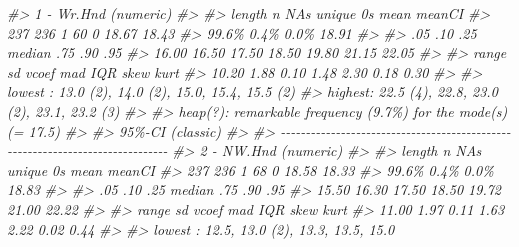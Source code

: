 \documentclass[
]{book}
\newenvironment{Shaded}{\begin{snugshade}}{\end{snugshade}}
\newcommand{\CommentTok}[1]{\textcolor[rgb]{0.56,0.35,0.01}{\textit{#1}}}
\begin{document}
\begin{Shaded}
\begin{Highlighting}[]
\CommentTok{\#\textgreater{} 1 {-} Wr.Hnd (numeric)}
\CommentTok{\#\textgreater{} }
\CommentTok{\#\textgreater{}   length      n    NAs  unique     0s   mean  meanCI\textquotesingle{}}
\CommentTok{\#\textgreater{}      237    236      1      60      0  18.67   18.43}
\CommentTok{\#\textgreater{}           99.6\%   0.4\%           0.0\%          18.91}
\CommentTok{\#\textgreater{}                                                     }
\CommentTok{\#\textgreater{}      .05    .10    .25  median    .75    .90     .95}
\CommentTok{\#\textgreater{}    16.00  16.50  17.50   18.50  19.80  21.15   22.05}
\CommentTok{\#\textgreater{}                                                     }
\CommentTok{\#\textgreater{}    range     sd  vcoef     mad    IQR   skew    kurt}
\CommentTok{\#\textgreater{}    10.20   1.88   0.10    1.48   2.30   0.18    0.30}
\CommentTok{\#\textgreater{}                                                     }
\CommentTok{\#\textgreater{} lowest : 13.0 (2), 14.0 (2), 15.0, 15.4, 15.5 (2)}
\CommentTok{\#\textgreater{} highest: 22.5 (4), 22.8, 23.0 (2), 23.1, 23.2 (3)}
\CommentTok{\#\textgreater{} }
\CommentTok{\#\textgreater{} heap(?): remarkable frequency (9.7\%) for the mode(s) (= 17.5)}
\CommentTok{\#\textgreater{} }
\CommentTok{\#\textgreater{} \textquotesingle{} 95\%{-}CI (classic)}
\CommentTok{\#\textgreater{} }
\CommentTok{\#\textgreater{} {-}{-}{-}{-}{-}{-}{-}{-}{-}{-}{-}{-}{-}{-}{-}{-}{-}{-}{-}{-}{-}{-}{-}{-}{-}{-}{-}{-}{-}{-}{-}{-}{-}{-}{-}{-}{-}{-}{-}{-}{-}{-}{-}{-}{-}{-}{-}{-}{-}{-}{-}{-}{-}{-}{-}{-}{-}{-}{-}{-}{-}{-}{-}{-}{-}{-}{-}{-}{-}{-}{-}{-}{-}{-}{-}{-}{-}{-} }
\CommentTok{\#\textgreater{} 2 {-} NW.Hnd (numeric)}
\CommentTok{\#\textgreater{} }
\CommentTok{\#\textgreater{}   length      n    NAs  unique     0s   mean  meanCI\textquotesingle{}}
\CommentTok{\#\textgreater{}      237    236      1      68      0  18.58   18.33}
\CommentTok{\#\textgreater{}           99.6\%   0.4\%           0.0\%          18.83}
\CommentTok{\#\textgreater{}                                                     }
\CommentTok{\#\textgreater{}      .05    .10    .25  median    .75    .90     .95}
\CommentTok{\#\textgreater{}    15.50  16.30  17.50   18.50  19.72  21.00   22.22}
\CommentTok{\#\textgreater{}                                                     }
\CommentTok{\#\textgreater{}    range     sd  vcoef     mad    IQR   skew    kurt}
\CommentTok{\#\textgreater{}    11.00   1.97   0.11    1.63   2.22   0.02    0.44}
\CommentTok{\#\textgreater{}                                                     }
\CommentTok{\#\textgreater{} lowest : 12.5, 13.0 (2), 13.3, 13.5, 15.0}

\end{Highlighting}
\end{Shaded}
\end{document}
